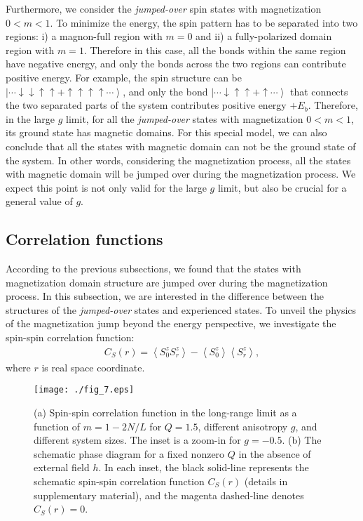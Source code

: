 \documentclass[article,10pt,onecolumn,superscriptaddress,floatfix]{revtex4}
\begin{document}
Furthermore, we consider the \textit{jumped-over} spin states with magnetization $0<m<1$. To minimize the energy, the spin pattern has to be separated into two regions: i) a magnon-full region with $m=0$ and ii) a fully-polarized domain region with $m=1$. Therefore in this case, all the bonds within the same region have negative energy, and only the bonds across the two regions can contribute positive energy. For example, the  spin structure can be  $\left|\cdots\downarrow\downarrow\uparrow\uparrow + \uparrow\uparrow\uparrow\uparrow \cdots\right\rangle$, and only the bond $\left|\cdots\downarrow\uparrow\uparrow + \uparrow \cdots\right\rangle$ that connects the two separated parts of the system contributes positive energy $+E_b$.
Therefore, in the large $g$ limit, for all the \textit{jumped-over} states with magnetization $0<m<1$, its ground state has magnetic domains. For this special model, we can also conclude that all the states with magnetic domain can not be the ground state of the system. In other words, considering the magnetization process, all the states with magnetic domain will be jumped over during the magnetization process. We expect this point is not only valid for the large $g$ limit, but also be crucial for a general value of $g$.


\subsection{Correlation functions}

According to the previous subsections, we found that the states with magnetization domain structure are jumped over during the magnetization process. In this subsection, we are interested in the difference between the structures of the \textit{jumped-over} states and experienced states.
To unveil the physics of the magnetization jump beyond the energy perspective, we investigate the spin-spin correlation function:
\begin{eqnarray}
C_{S}(r)=\left<S^z_0 S^z_r\right>-\left<S^z_0\right>\left<S^z_r\right>,
\end{eqnarray}
where $r$ is real space coordinate.

\begin{figure}[!tb] %
	\centering
	\texttt{[image: ./fig\_7.eps]}
	\caption{ (a) Spin-spin correlation function in the long-range limit as a function of $m=1-2N/L$ for $Q=1.5$, different anisotropy $g$, and different system sizes. The inset is a zoom-in for $g=-0.5$. (b) The schematic phase diagram for a fixed nonzero $Q$ in the absence of external field $h$. In each inset, the black solid-line represents the schematic spin-spin correlation function $C_{S}\left(r\right)$ (details in supplementary material), and the magenta dashed-line denotes $C_{S}(r)=0$.}
	\label{fig:long_range_order}
\end{figure}
\end{document}

